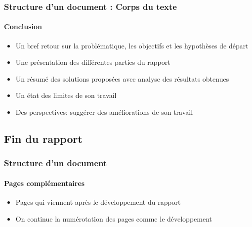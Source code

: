 \documentclass[xcolor=table]{beamer}
\begin{document}
\begin{frame}
\frametitle{Structure d'un document : Corps du texte}
\framesubtitle{Conclusion}

\begin{minipage}{0.60\textwidth}
	\begin{itemize}
		\item Un bref retour sur la problématique, les objectifs et les hypothèses de départ
		\item Une présentation des différentes parties du rapport
		\item Un résumé des solutions proposées avec analyse des résultats obtenues
		\item Un état des limites de son travail 
		\item Des perspectives: suggérer des améliorations de son travail
	\end{itemize}
\end{minipage}
\begin{minipage}{0.38\textwidth}
\end{minipage}

\end{frame}

\subsection{Fin du rapport}

\begin{frame}
\frametitle{Structure d'un document}
\framesubtitle{Pages complémentaires}

\begin{itemize}
	\item Pages qui viennent après le développement du rapport
	\item On continue la numérotation des pages comme le développement
\end{itemize}

\end{frame}
\end{document}
